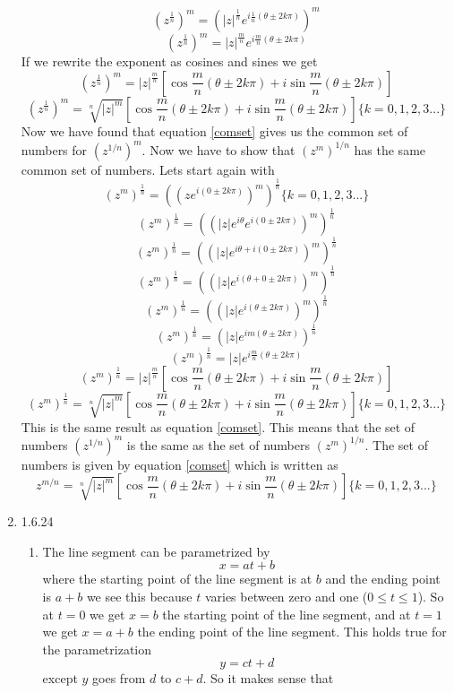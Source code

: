 \documentclass[11pt]{article}
\begin{document}
\begin{enumerate}
$$\left(z^{\frac{1}{n}}\right)^m = \left(|z|^{\frac{1}{n}} e^{i\frac{1}{n}(\theta \pm 2k\pi)}\right)^m$$
$$\left(z^{\frac{1}{n}}\right)^m = |z|^{\frac{m}{n}} e^{i\frac{m}{n}(\theta \pm 2k\pi)}$$
If we rewrite the exponent as cosines and sines we get
$$\left(z^{\frac{1}{n}}\right)^m = |z|^{\frac{m}{n}} \left[\cos{\frac{m}{n}(\theta \pm 2k\pi)} + i\sin{\frac{m}{n}(\theta \pm 2k\pi)}\right]$$
\begin{equation}
\left(z^{\frac{1}{n}}\right)^m = \sqrt[n]{|z|^{m}} \left[\cos{\frac{m}{n}(\theta \pm 2k\pi)} + i\sin{\frac{m}{n}(\theta \pm 2k\pi)}\right] \{k = 0, 1, 2, 3 ...\}
\label{comset}
\end{equation}
Now we have found that equation \ref{comset} gives us the common set of numbers for $(z^{1/n})^m$. Now we have to show that $(z^m)^{1/n}$ has the same common set of numbers. Lets start again with
$$\left(z^m\right)^{\frac{1}{n}} = \left(\left(z e^{i(0 \pm 2k\pi)}\right)^{m}\right)^{\frac{1}{n}} \{k = 0, 1, 2, 3... \}$$
$$\left(z^{m}\right)^{\frac{1}{n}} = \left(\left(|z| e^{i\theta} e^{i(0 \pm 2k\pi)}\right)^m\right)^{\frac{1}{n}}$$
$$\left(z^{m}\right)^{\frac{1}{n}} = \left(\left(|z| e^{i\theta + i(0 \pm 2k\pi)}\right)^m\right)^{\frac{1}{n}}$$
$$\left(z^{m}\right)^{\frac{1}{n}} = \left(\left(|z| e^{i(\theta + 0 \pm 2k\pi)}\right)^m\right)^{\frac{1}{n}}$$
$$\left(z^{m}\right)^{\frac{1}{n}} = \left(\left(|z| e^{i(\theta \pm 2k\pi)}\right)^m\right)^{\frac{1}{n}}$$
$$\left(z^{m}\right)^{\frac{1}{n}} = \left(|z| e^{i m (\theta \pm 2k\pi)}\right)^{\frac{1}{n}}$$
$$\left(z^{m}\right)^{\frac{1}{n}} = |z| e^{i \frac{m}{n} (\theta \pm 2k\pi)}$$
$$\left(z^m\right)^{\frac{1}{n}} = |z|^{\frac{m}{n}} \left[\cos{\frac{m}{n}(\theta \pm 2k\pi)} + i\sin{\frac{m}{n}(\theta \pm 2k\pi)}\right]$$
$$\left(z^m\right)^{\frac{1}{n}} = \sqrt[n]{|z|^{m}} \left[\cos{\frac{m}{n}(\theta \pm 2k\pi)} + i\sin{\frac{m}{n}(\theta \pm 2k\pi)}\right] \{k = 0, 1, 2, 3 ...\}$$
This is the same result as equation \ref{comset}. This means that the set of numbers $(z^{1/n})^m$ is the same as the set of numbers $(z^m)^{1/n}$. The set of numbers is given by equation \ref{comset} which is written as 
$$z^{m/n} = \sqrt[n]{|z|^{m}} \left[\cos{\frac{m}{n}(\theta \pm 2k\pi)} + i\sin{\frac{m}{n}(\theta \pm 2k\pi)}\right] \{k = 0, 1, 2, 3 ...\}$$
\item 1.6.24
\begin{enumerate}
\item
The line segment can be parametrized by 
$$x = at + b$$
where the starting point of the line segment is at $b$ and the ending point is $a+b$ we see this because $t$ varies between zero and one ($0 \le t\le 1$). So at $t=0$ we get $x=b$ the starting point of the line segment, and at $t=1$ we get $x=a+b$ the ending point of the line segment. This holds true for the parametrization $$y=ct+d$$ except $y$ goes from $d$ to $c+d$. So it makes sense that 

\end{enumerate}
\end{enumerate}
\end{document}
